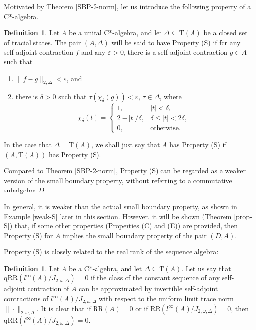 \documentclass[12pt, oneside, psamsfonts]{amsart}
\theoremstyle{definition}
\newtheorem{defn}[thm]{Definition}
\theoremstyle{remark}
\numberwithin{equation}{section}
\newcommand{\norm}[1]{\| #1\|}
\newcommand{\abs}[1]{| #1 |}
\newcommand{\eps}{\varepsilon}
\newcommand{\tr}{\mathrm{T}}
\begin{document}
Motivated by Theorem \ref{SBP-2-norm}, let us introduce the following property of a C*-algebra.
\begin{defn}\label{defn-S}
Let $A$ be a unital C*-algebra, and let $\Delta \subseteq \tr(A)$ be a closed set of tracial states. The pair $(A, \Delta)$ will be said to have Property (S) if for any self-adjoint contraction $f$ and any $\eps>0$, there is a self-adjoint contraction $g \in A$ such that 
\begin{enumerate}
\item $\norm{f - g }_{2, \Delta} < \eps$, and
\item there is $\delta>0$ such that $\tau(\chi_\delta(g)) < \eps$, $\tau \in \Delta$,
where 
\begin{equation}\label{chi-defn}
\chi_\delta(t) = \left\{ \begin{array}{ll}
1, & \abs{t} < \delta, \\
2-\abs{t}/\delta, & \delta\leq \abs{t} < 2\delta, \\
0, & \mathrm{otherwise}.
\end{array}\right.
\end{equation}
\end{enumerate}

In the case that $\Delta = \tr(A)$, we shall just say that $A$ has Property (S) if $(A, \tr(A))$ has Property (S).
\end{defn}

Compared to Theorem \ref{SBP-2-norm}, Property (S) can be regarded as a weaker version of the small boundary property, without referring to a commutative subalgebra $D$. 

In general, it is weaker than the actual small boundary property, as shown in Example \ref{weak-S} later in this section. However, it will be shown  (Theorem  \ref{prop-S}) that, if some other properties (Properties (C) and (E)) are provided, then Property (S) for $A$ implies the small boundary property of the pair $(D, A)$.



Property (S) is closely related to the real rank of the sequence algebra:
\begin{defn}\label{qRR-defn}
Let $A$ be a C*-algebra, and let $\Delta\subseteq\tr(A)$. Let us say that $\mathrm{qRR}(l^\infty(A)/J_{2, \omega, \Delta}) = 0$ if the class of the constant sequence of any self-adjoint contraction of $A$ can be approximated by invertible self-adjoint contractions of $l^\infty(A)/J_{2, \omega, \Delta}$ with respect to the uniform limit trace norm $\norm{\cdot}_{2, \omega, \Delta}$. It is clear that if $\mathrm{RR}(A) = 0$ or if $\mathrm{RR}(l^\infty(A)/J_{2, \omega, \Delta}) = 0$, then $\mathrm{qRR}(l^\infty(A)/J_{2, \omega, \Delta}) = 0$.

\end{defn}
\end{document}
